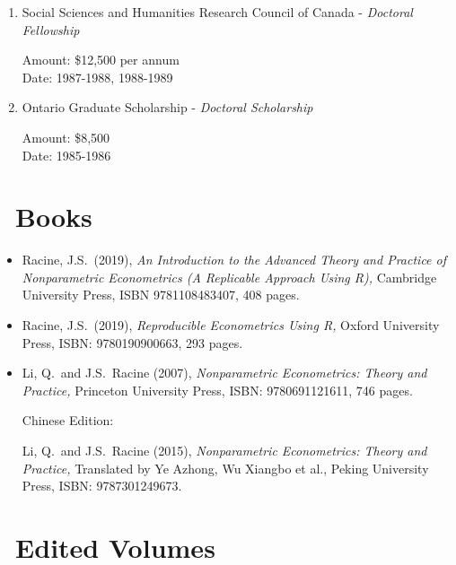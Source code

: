 \documentclass[
]{article}
\begin{document}
\begin{enumerate}
  Joint work with D.~Shapiro, J.B.~Smith, and M.~Stelcner\\
  Title: \emph{The Gender Earnings Gap and Labour Market Discrimination
  in Canada: A Reassessment and Extension of Econometric and Policy
  Analysis}\\
  Amount: \$20,000\\
  Date: October 1, 1990 - September 31, 1992
\item
  Social Sciences and Humanities Research Council of Canada -
  \emph{Doctoral Fellowship}

  Amount: \$12,500 per annum\\
  Date: 1987-1988, 1988-1989
\item
  Ontario Graduate Scholarship - \emph{Doctoral Scholarship}

  Amount: \$8,500\\
  Date: 1985-1986
\end{enumerate}

\section*{\texorpdfstring{\faBook~Books}{~Books}}\label{books}

\begin{itemize}
\item
  Racine, J.S.~(2019), \emph{An Introduction to the Advanced Theory and
  Practice of Nonparametric Econometrics (A Replicable Approach Using
  R),} Cambridge University Press, ISBN 9781108483407, 408 pages.
\item
  Racine, J.S.~(2019), \emph{Reproducible Econometrics Using R,} Oxford
  University Press, ISBN: 9780190900663, 293 pages.
\item
  Li, Q.~and J.S.~Racine (2007), \emph{Nonparametric Econometrics:
  Theory and Practice,} Princeton University Press, ISBN: 9780691121611,
  746 pages.

  Chinese Edition:

  Li, Q.~and J.S.~Racine (2015), \emph{Nonparametric Econometrics:
  Theory and Practice,} Translated by Ye Azhong, Wu Xiangbo et al.,
  Peking University Press, ISBN: 9787301249673.
\end{itemize}

\section*{\texorpdfstring{\faBookOpen~Edited
Volumes}{~Edited Volumes}}\label{edited-volumes}
\end{document}
